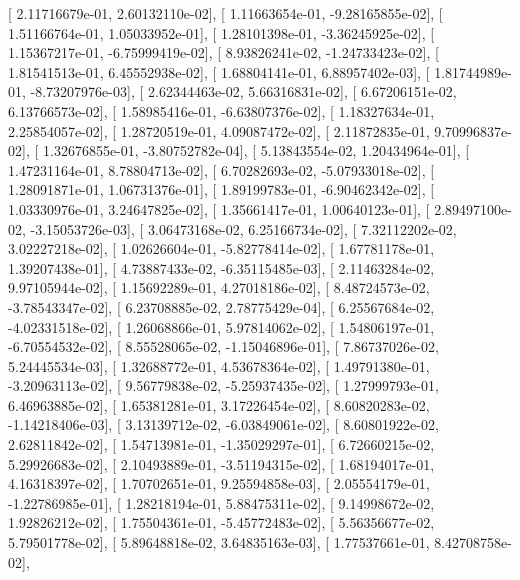 \documentclass{article}
\begin{document}
       [  2.11716679e-01,   2.60132110e-02],
       [  1.11663654e-01,  -9.28165855e-02],
       [  1.51166764e-01,   1.05033952e-01],
       [  1.28101398e-01,  -3.36245925e-02],
       [  1.15367217e-01,  -6.75999419e-02],
       [  8.93826241e-02,  -1.24733423e-02],
       [  1.81541513e-01,   6.45552938e-02],
       [  1.68804141e-01,   6.88957402e-03],
       [  1.81744989e-01,  -8.73207976e-03],
       [  2.62344463e-02,   5.66316831e-02],
       [  6.67206151e-02,   6.13766573e-02],
       [  1.58985416e-01,  -6.63807376e-02],
       [  1.18327634e-01,   2.25854057e-02],
       [  1.28720519e-01,   4.09087472e-02],
       [  2.11872835e-01,   9.70996837e-02],
       [  1.32676855e-01,  -3.80752782e-04],
       [  5.13843554e-02,   1.20434964e-01],
       [  1.47231164e-01,   8.78804713e-02],
       [  6.70282693e-02,  -5.07933018e-02],
       [  1.28091871e-01,   1.06731376e-01],
       [  1.89199783e-01,  -6.90462342e-02],
       [  1.03330976e-01,   3.24647825e-02],
       [  1.35661417e-01,   1.00640123e-01],
       [  2.89497100e-02,  -3.15053726e-03],
       [  3.06473168e-02,   6.25166734e-02],
       [  7.32112202e-02,   3.02227218e-02],
       [  1.02626604e-01,  -5.82778414e-02],
       [  1.67781178e-01,   1.39207438e-01],
       [  4.73887433e-02,  -6.35115485e-03],
       [  2.11463284e-02,   9.97105944e-02],
       [  1.15692289e-01,   4.27018186e-02],
       [  8.48724573e-02,  -3.78543347e-02],
       [  6.23708885e-02,   2.78775429e-04],
       [  6.25567684e-02,  -4.02331518e-02],
       [  1.26068866e-01,   5.97814062e-02],
       [  1.54806197e-01,  -6.70554532e-02],
       [  8.55528065e-02,  -1.15046896e-01],
       [  7.86737026e-02,   5.24445534e-03],
       [  1.32688772e-01,   4.53678364e-02],
       [  1.49791380e-01,  -3.20963113e-02],
       [  9.56779838e-02,  -5.25937435e-02],
       [  1.27999793e-01,   6.46963885e-02],
       [  1.65381281e-01,   3.17226454e-02],
       [  8.60820283e-02,  -1.14218406e-03],
       [  3.13139712e-02,  -6.03849061e-02],
       [  8.60801922e-02,   2.62811842e-02],
       [  1.54713981e-01,  -1.35029297e-01],
       [  6.72660215e-02,   5.29926683e-02],
       [  2.10493889e-01,  -3.51194315e-02],
       [  1.68194017e-01,   4.16318397e-02],
       [  1.70702651e-01,   9.25594858e-03],
       [  2.05554179e-01,  -1.22786985e-01],
       [  1.28218194e-01,   5.88475311e-02],
       [  9.14998672e-02,   1.92826212e-02],
       [  1.75504361e-01,  -5.45772483e-02],
       [  5.56356677e-02,   5.79501778e-02],
       [  5.89648818e-02,   3.64835163e-03],
       [  1.77537661e-01,   8.42708758e-02],
\end{document}
